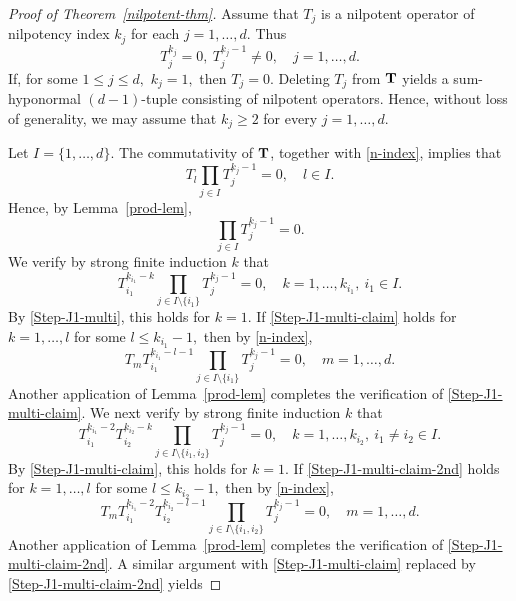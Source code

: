 \documentclass[10pt, a4paper, oneside, reqno]{amsproc}
\numberwithin{equation}{section}
\theoremstyle{remark}
\theoremstyle{definition}
\newcommand*{\Ge}{\geqslant}
\newcommand*{\Le}{\leqslant}
\begin{document}
\begin{proof}[Proof of Theorem~\ref{nilpotent-thm}]
Assume that $T_j$ is a nilpotent operator of nilpotency index $k_j$ for each $j=1, \ldots, d$. 
Thus
\begin{equation} \label{n-index}
T^{k_j}_j =0, ~T^{k_j-1}_j \neq 0, \quad j=1, \ldots, d. 
\end{equation}
If, for some $1 \Le j \Le d,$ $k_j=1,$ then $T_j=0.$ Deleting  $T_j$ from ${\bf T}$ yields a sum-hyponormal $(d-1)$-tuple consisting of nilpotent operators. Hence, without loss of generality, we may assume that $k_j\Ge 2$ for every $j=1, \ldots, d$. 

Let $I=\{1, \ldots, d\}$.
The commutativity of ${\bf T}$, together with \eqref{n-index}, implies that 
$$T_l \prod_{j \in I} T^{k_j-1}_j=0, \quad l \in I.$$ 
Hence, by Lemma~\ref{prod-lem}, 
\begin{equation} 
\label{Step-J1-multi}
\prod_{j \in I} T^{k_j-1}_j=0.
\end{equation}
We verify by strong finite induction $k$ that
\begin{equation} 
\label{Step-J1-multi-claim}
T^{k_{i_1}-k}_{i_1}\prod_{j \in I\setminus\{i_1\}} T^{k_j-1}_j=0, \quad k =1, \ldots, k_{i_1}, ~i_1 \in I.
\end{equation}
By \eqref{Step-J1-multi}, this holds for $k=1$. If \eqref{Step-J1-multi-claim} holds for $k=1, \ldots, l$ for some $l \Le k_{i_1}-1,$ then by \eqref{n-index}, 
\begin{equation*}
T_m T^{k_{i_1}-l-1}_{i_1}\prod_{j \in I\setminus\{i_1\}} T^{k_j-1}_j=0, \quad m=1, \ldots, d.
\end{equation*}  
Another application of Lemma~\ref{prod-lem} completes the verification of \eqref{Step-J1-multi-claim}. We next verify by strong finite induction $k$ that
\begin{equation} 
\label{Step-J1-multi-claim-2nd}
T^{k_{i_1}-2}_{i_1} T^{k_{i_2}-k}_{i_2}  \prod_{j \in I\setminus\{i_1, i_2\}} T^{k_j-1}_j=0, \quad k =1, \ldots, k_{i_2}, ~i_1 \neq i_2 \in I.
\end{equation}
By \eqref{Step-J1-multi-claim}, this holds for $k=1$. If \eqref{Step-J1-multi-claim-2nd} holds for $k=1, \ldots, l$ for some $l \Le k_{i_2}-1,$ then  by \eqref{n-index}, 
\begin{equation*}
T_m T^{k_{i_1}-2}_{i_1} T^{k_{i_2}-l-1}_{i_2}\prod_{j \in I\setminus\{i_1, i_2\}} T^{k_j-1}_j=0, \quad m=1, \ldots, d.
\end{equation*}  
Another application of Lemma~\ref{prod-lem} completes the verification of \eqref{Step-J1-multi-claim-2nd}. A similar argument with \eqref{Step-J1-multi-claim} replaced by \eqref{Step-J1-multi-claim-2nd} yields  

\end{proof}
\end{document}

